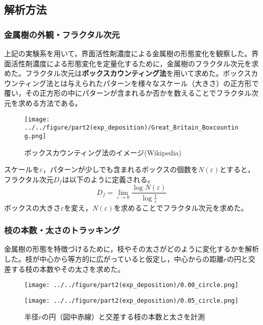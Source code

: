 \documentclass[autodetect-engine,dvi=dvipdfmx,a4paper,ja=standard,oneside,openany,11pt,draft]{bxjsarticle}
\begin{document}
\subsection{解析方法}
\subsubsection{金属樹の外観・フラクタル次元}
上記の実験系を用いて，界面活性剤濃度による金属樹の形態変化を観察した。界面活性剤濃度による形態変化を定量化するために，金属樹のフラクタル次元を求めた。フラクタル次元は\textbf{ボックスカウンティング法}を用いて求めた。ボックスカウンティング法とは与えられたパターンを様々なスケール（大きさ）の正方形で覆い，その正方形の中にパターンが含まれるか否かを数えることでフラクタル次元を求める方法である。
\begin{figure}[H]
  \centering
  \texttt{[image: ../../figure/part2(exp\_deposition)/Great\_Britain\_Boxcounting.png]}
  \caption{ボックスカウンティング法のイメージ(Wikipedia)}
  \label{fig:box_counting}
\end{figure}
スケールを$\varepsilon$，パターンが少しでも含まれるボックスの個数を$N(\varepsilon)$とすると，フラクタル次元$D_f$は以下のように定義される。
\begin{equation}
  D_f = \lim_{\varepsilon \to 0} \frac{\log N(\varepsilon)}{\log \frac{1}{\varepsilon}}
\end{equation}
ボックスの大きさ$\varepsilon$を変え，$N(\varepsilon)$を求めることでフラクタル次元を求めた。
\subsubsection{枝の本数・太さのトラッキング}
金属樹の形態を特徴づけるために，枝やその太さがどのように変化するかを解析した。枝が中心から等方的に広がっていると仮定し，中心からの距離$r$の円と交差する枝の本数やその太さを求めた。
\begin{figure}[H]
  \begin{minipage}
    {0.5\textwidth}
    \centering
    \texttt{[image: ../../figure/part2(exp\_deposition)/0.00\_circle.png]}
    \label{fig:0.00_circle}
  \end{minipage}
  \begin{minipage}
    {0.5\textwidth}
    \centering
    \texttt{[image: ../../figure/part2(exp\_deposition)/0.05\_circle.png]}
    \label{fig:0.05_circle}
  \end{minipage}
  \caption{半径$r$の円（図中赤線）と交差する枝の本数と太さを計測}
\end{figure}
\end{document}
